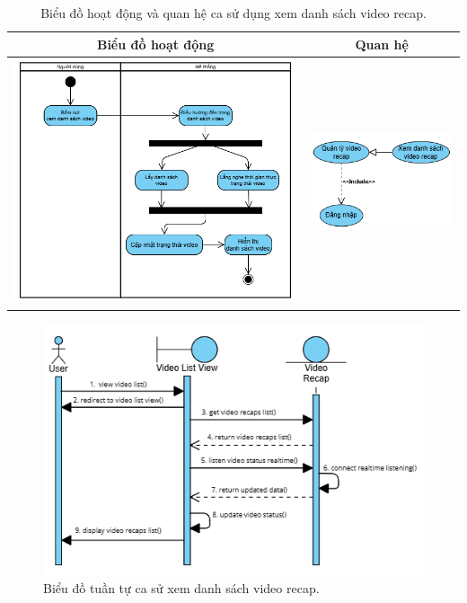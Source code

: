\vspace{0.8cm}

\noindent 
\begin{table}[H]
\centering
\begin{tabular}{| c | c |}
    \hline
    \textbf{Biểu đồ hoạt động} & \textbf{Quan hệ} \\ 
    \hline
    \includegraphics[width=0.6\linewidth]{figures/c3/3-3-8-activity-diagram.png} 
    &  
    \includegraphics[width=0.35\linewidth]{figures/c3/3-3-8-relationship.png} \\ 
    \hline
\end{tabular}
\caption{Biểu đồ hoạt động và quan hệ ca sử dụng xem danh sách video recap.}
\label{tab:view-video-recap-usecase-activity}
\end{table}

\begin{figure}[ht]
    \centering  
    \includegraphics[width=1.1\textwidth]{figures/c3/3-3-8-sequence-diagram.png}
    \caption{Biểu đồ tuần tự ca sử xem danh sách video recap.}
    \label{fig:3-3-8-sequence-diagram}
\end{figure}
